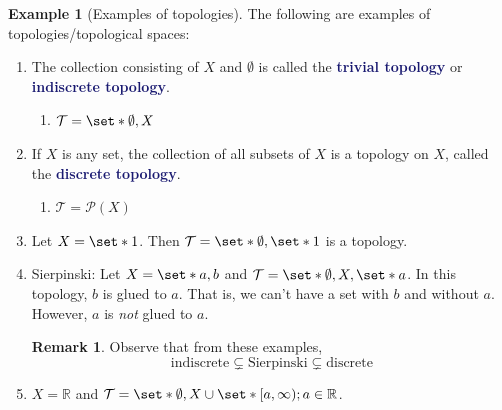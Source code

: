 \documentclass[11pt]{article}
\numberwithin{equation}{section}
\newcommand{\navy}[1]{\textcolor{MidnightBlue}{\bf #1}}
\theoremstyle{plain}
\theoremstyle{definition}
\newtheorem{definition}{\color{MidnightBlue}{\textbf{Definition}}}[section]
\newtheorem{example}{\color{WildStrawberry}Example}[section]
\newtheorem*{remark}{Remark}
\def\Set{\set*}%
\newcommand{\1}{\mathbbm 1}
\newcommand{\RR}{\mathbb R}
\newcommand{\pP}{\mathcal P}
\newcommand{\tT}{\mathcal T}
\begin{document}
\begin{example}[Examples of topologies]
The following are examples of topologies/topological spaces:
\begin{enumerate}
	\item The collection consisting of $X$ and $\emptyset$ is called the \navy{trivial topology} or \navy{indiscrete topology}. 
	\begin{enumerate}
		\item $\tT = \Set{\emptyset, X}$
	\end{enumerate}
	\item If $X$ is any set, the collection of all subsets of $X$ is a topology on $X$, called the \navy{discrete topology}.
	\begin{enumerate}
		\item $\tT = \pP(X)$
	\end{enumerate}
	\item Let $X = \Set{1}$. Then $\tT = \Set{\emptyset, \Set{1}}$ is a topology.
	\item Sierpinski: Let $X = \Set{a,b}$ and $\tT = \Set{\emptyset, X, \Set{a}}$. In this topology, $b$ is glued to $a$. That is, we can't have a set with $b$ and without $a$. However, $a$ is \emph{not} glued to $a$. 
	\begin{remark}
	Observe that from these examples,
	\begin{equation*}
		\text{indiscrete} \subsetneq \text{Sierpinski} \subsetneq \text{discrete}
	\end{equation*}
	\end{remark}	
	\item $X = \RR$ and $\tT = \Set{\emptyset, X} \cup \Set{[a,\infty); a \in \RR}$.
\end{enumerate}
\end{example}



\end{document}
